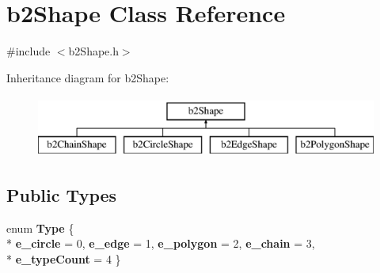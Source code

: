 \hypertarget{classb2_shape}{}\section{b2\+Shape Class Reference}
\label{classb2_shape}


{\ttfamily \#include $<$b2\+Shape.\+h$>$}

Inheritance diagram for b2\+Shape\+:\begin{figure}[H]
\begin{center}
\leavevmode
\includegraphics[height=2.000000cm]{classb2_shape}
\end{center}
\end{figure}
\subsection*{Public Types}
\begin{DoxyCompactItemize}
\item 
enum {\bfseries Type} \{ \\*
{\bfseries e\+\_\+circle} = 0, 
{\bfseries e\+\_\+edge} = 1, 
{\bfseries e\+\_\+polygon} = 2, 
{\bfseries e\+\_\+chain} = 3, 
\\*
{\bfseries e\+\_\+type\+Count} = 4
 \}\hypertarget{classb2_shape_a4c1f3a9ad6b3150bb90ad9018ca4b1e0}{}\label{classb2_shape_a4c1f3a9ad6b3150bb90ad9018ca4b1e0}

\end{DoxyCompactItemize}
